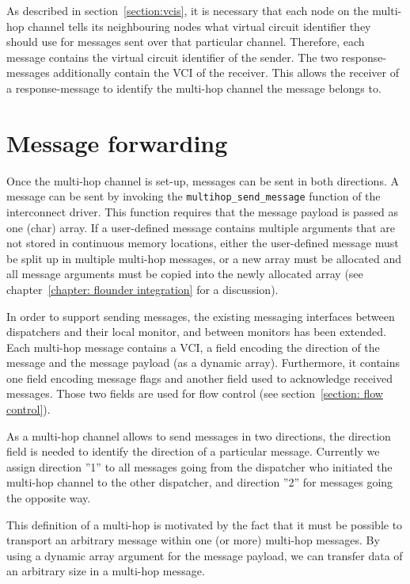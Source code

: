 \documentclass[a4paper,twoside]{report} %
\begin{document}
As described in section~\ref{section:vcis}, it is necessary that each node on the multi-hop channel tells its neighbouring nodes what virtual circuit identifier they should use for messages sent over that particular channel. Therefore, each message contains the virtual circuit identifier of the sender.  The two response-messages additionally contain the VCI of the receiver. This allows the receiver of a response-message to identify the multi-hop channel the message belongs to.


\section{Message forwarding}
\label{section: message forwarding}
Once the multi-hop channel is set-up, messages can be sent in both directions. A message can be sent by invoking the \texttt{multihop\_send\_message} function of the interconnect driver.  This function requires that the message payload is passed as one (char) array. If a user-defined message contains multiple arguments that are not stored in continuous memory locations, either the user-defined message must be split up in multiple multi-hop messages, or a new array must be allocated and all message arguments must be copied into the newly allocated array (see chapter~\ref{chapter: flounder integration} for a discussion).

In order to support sending messages, the existing messaging interfaces between dispatchers and their local monitor, and between monitors has been extended. Each multi-hop  message contains a VCI, a field encoding the direction of the message and the message payload (as a dynamic array). Furthermore, it contains one field encoding message flags and another field used to acknowledge received messages. Those two fields are used for flow control (see section~\ref{section: flow control}).

As a multi-hop channel allows to send messages in two directions, the direction field is needed to identify the direction of a particular message. Currently we assign direction ''1'' to all messages going from the dispatcher who initiated the multi-hop channel to the other dispatcher, and direction ''2'' for messages going the opposite way. 

This definition of a multi-hop is motivated by the fact that it must be possible to transport an arbitrary message within one (or more) multi-hop messages. By using a dynamic array argument for the message payload, we can transfer data of an arbitrary size in a multi-hop message.
\end{document}
